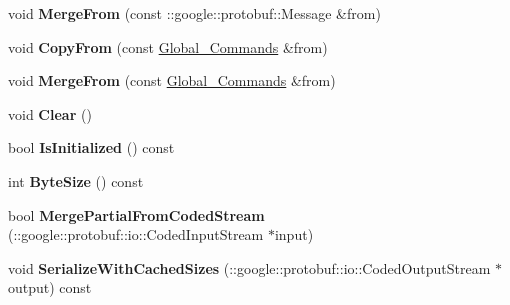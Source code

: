 \begin{DoxyCompactItemize}
\item 
void {\bfseries Merge\+From} (const \+::google\+::protobuf\+::\+Message \&from)\hypertarget{classvss__command_1_1Global__Commands_a70b24974df993bc6cd742f074555544b}{}\label{classvss__command_1_1Global__Commands_a70b24974df993bc6cd742f074555544b}

\item 
void {\bfseries Copy\+From} (const \hyperlink{classvss__command_1_1Global__Commands}{Global\+\_\+\+Commands} \&from)\hypertarget{classvss__command_1_1Global__Commands_a2c2be618a14de139a996c3f40cdcaa7c}{}\label{classvss__command_1_1Global__Commands_a2c2be618a14de139a996c3f40cdcaa7c}

\item 
void {\bfseries Merge\+From} (const \hyperlink{classvss__command_1_1Global__Commands}{Global\+\_\+\+Commands} \&from)\hypertarget{classvss__command_1_1Global__Commands_a72522cd185ed392c8dba2b746f1c10be}{}\label{classvss__command_1_1Global__Commands_a72522cd185ed392c8dba2b746f1c10be}

\item 
void {\bfseries Clear} ()\hypertarget{classvss__command_1_1Global__Commands_a9027fa1a333a49d2a9e7927f1241d2d7}{}\label{classvss__command_1_1Global__Commands_a9027fa1a333a49d2a9e7927f1241d2d7}

\item 
bool {\bfseries Is\+Initialized} () const \hypertarget{classvss__command_1_1Global__Commands_ab59f63095dd243cd7311d9142a9326ef}{}\label{classvss__command_1_1Global__Commands_ab59f63095dd243cd7311d9142a9326ef}

\item 
int {\bfseries Byte\+Size} () const \hypertarget{classvss__command_1_1Global__Commands_a05036b0569ebf9d13ff9cee1430ffb12}{}\label{classvss__command_1_1Global__Commands_a05036b0569ebf9d13ff9cee1430ffb12}

\item 
bool {\bfseries Merge\+Partial\+From\+Coded\+Stream} (\+::google\+::protobuf\+::io\+::\+Coded\+Input\+Stream $\ast$input)\hypertarget{classvss__command_1_1Global__Commands_a0d0fcd0747bad0226fb5a0829f45ed1b}{}\label{classvss__command_1_1Global__Commands_a0d0fcd0747bad0226fb5a0829f45ed1b}

\item 
void {\bfseries Serialize\+With\+Cached\+Sizes} (\+::google\+::protobuf\+::io\+::\+Coded\+Output\+Stream $\ast$output) const \hypertarget{classvss__command_1_1Global__Commands_a35292dbb1e0ac73f11bedc01a64e751e}{}\label{classvss__command_1_1Global__Commands_a35292dbb1e0ac73f11bedc01a64e751e}


\end{DoxyCompactItemize}
